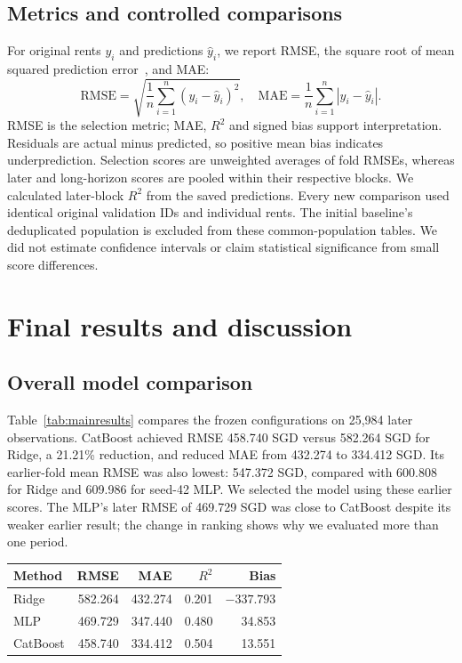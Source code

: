 \documentclass[conference]{IEEEtran}
\makeatletter
\newenvironment{localtable}{\par\addvspace{\medskipamount}\noindent
  \begin{minipage}{\columnwidth}\def\@captype{table}}{\end{minipage}\par
  \addvspace{\medskipamount}}
\makeatother
\begin{document}
\subsection{Metrics and controlled comparisons}
For original rents $y_i$ and predictions $\hat y_i$, we report RMSE,
the square root of mean squared prediction error~\cite{rmse_reference},
and MAE:
\begin{equation}
 \mathrm{RMSE}=\sqrt{\frac{1}{n}\sum_{i=1}^{n}(y_i-\hat y_i)^2},
 \quad \mathrm{MAE}=\frac{1}{n}\sum_{i=1}^{n}|y_i-\hat y_i|.
\end{equation}
RMSE is the selection metric; MAE, $R^2$ and signed bias support interpretation.
Residuals are actual minus predicted, so positive mean bias indicates
underprediction. Selection scores are unweighted averages of fold RMSEs,
whereas later and long-horizon scores are pooled within their respective
blocks. We calculated later-block $R^2$ from the saved predictions.
Every new comparison used identical original validation IDs and individual
rents. The initial baseline's deduplicated population is excluded from these
common-population tables. We did not estimate confidence intervals or
claim statistical significance from small score differences.

\section{Final results and discussion}
\label{sec:results}

\subsection{Overall model comparison}
Table~\ref{tab:mainresults} compares the frozen configurations on 25,984
later observations. CatBoost achieved RMSE 458.740 SGD versus 582.264 SGD
for Ridge, a 21.21\% reduction, and reduced MAE from 432.274 to 334.412 SGD.
Its earlier-fold mean RMSE was also lowest: 547.372 SGD, compared with
600.808 for Ridge and 609.986 for seed-42 MLP. We selected the model using these earlier scores. The MLP's later RMSE of 469.729 SGD was close to CatBoost despite
its weaker earlier result; the change in ranking shows why
we evaluated more than one period.

\begin{localtable}
  \caption{July 2024--March 2025 comparison (25,984 original rows).
  All models use 35 base features. Errors and bias are in SGD.}
  \label{tab:mainresults}
  \centering\small
  \begin{tabularx}{\columnwidth}{Xrrrr}
    \toprule
    Method & RMSE & MAE & $R^2$ & Bias \\
    \midrule
    Ridge & 582.264 & 432.274 & 0.201 & $-337.793$ \\
    MLP & 469.729 & 347.440 & 0.480 & 34.853 \\
    CatBoost & 458.740 & 334.412 & 0.504 & 13.551 \\
    \bottomrule
  \end{tabularx}
\end{localtable}
\end{document}
